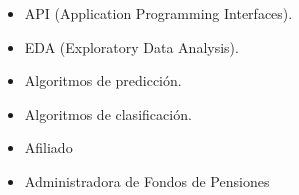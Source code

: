 \begin{itemize}
    \item API (Application Programming Interfaces).
    \item  EDA (Exploratory Data Analysis).
    \item  Algoritmos de predicción.
    \item Algoritmos de clasificación.
    \item Afiliado
    \item Administradora de Fondos de Pensiones
\end{itemize}